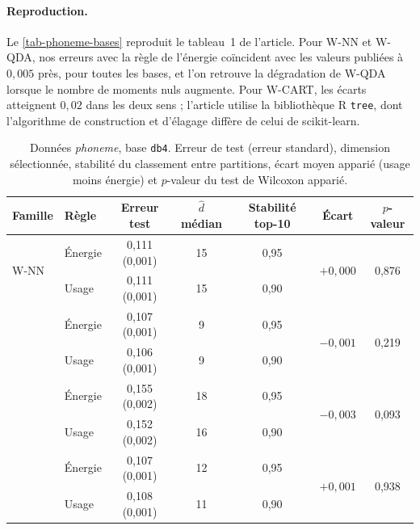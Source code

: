 \paragraph{Reproduction.} Le \cref{tab-phoneme-bases} reproduit le tableau~1 de l'article. Pour W-NN et W-QDA, nos erreurs avec la règle de l'énergie coïncident avec les valeurs publiées à $0{,}005$ près, pour toutes les bases, et l'on retrouve la dégradation de W-QDA lorsque le nombre de moments nuls augmente. Pour W-CART, les écarts atteignent $0{,}02$ dans les deux sens ; l'article utilise la bibliothèque R \texttt{tree}, dont l'algorithme de construction et d'élagage diffère de celui de scikit-learn.

\begin{table}[ht]
\centering
\small
\begin{tabular}{@{}llccccc@{}}
\toprule
Famille & Règle & Erreur test & $\hat d$ médian & Stabilité top-10 & Écart & $p$-valeur \\
\midrule
\multirow{2}{*}{W-NN} & Énergie & 0{,}111 (0{,}001) & 15 & 0{,}95 & \multirow{2}{*}{$+0{,}000$} & \multirow{2}{*}{0{,}876} \\
 & Usage & 0{,}111 (0{,}001) & 15 & 0{,}90 &  &  \\
\addlinespace
\multirow{2}{*}{W-QDA} & Énergie & 0{,}107 (0{,}001) & 9 & 0{,}95 & \multirow{2}{*}{$-0{,}001$} & \multirow{2}{*}{0{,}219} \\
 & Usage & 0{,}106 (0{,}001) & 9 & 0{,}90 &  &  \\
\addlinespace
\multirow{2}{*}{W-CART} & Énergie & 0{,}155 (0{,}002) & 18 & 0{,}95 & \multirow{2}{*}{$-0{,}003$} & \multirow{2}{*}{0{,}093} \\
 & Usage & 0{,}152 (0{,}002) & 16 & 0{,}90 &  &  \\
\addlinespace
\multirow{2}{*}{Toutes} & Énergie & 0{,}107 (0{,}001) & 12 & 0{,}95 & \multirow{2}{*}{$+0{,}001$} & \multirow{2}{*}{0{,}938} \\
 & Usage & 0{,}108 (0{,}001) & 11 & 0{,}90 &  &  \\
\bottomrule
\end{tabular}

\caption{Données \emph{phoneme}, base \texttt{db4}. Erreur de test (erreur standard), dimension sélectionnée, stabilité du classement entre partitions, écart moyen apparié (usage moins énergie) et $p$-valeur du test de Wilcoxon apparié.}
\label{tab-phoneme-resume}
\end{table}

